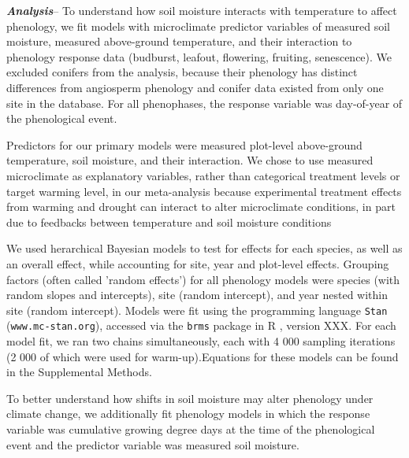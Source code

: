 \documentclass{article}
\begin{document}
\textbf {\emph{Analysis}}--
To understand how soil moisture interacts with temperature to affect phenology, we fit models with microclimate predictor variables of measured soil moisture, measured above-ground temperature, and their interaction to phenology response data (budburst, leafout, flowering, fruiting, senescence). We excluded conifers from the analysis, because their phenology has distinct differences from angiosperm phenology \cite{polgar2014} and conifer data existed from only one site in the database. For all phenophases, the response variable was day-of-year of the phenological event. 
\par Predictors for our primary models were measured plot-level above-ground temperature, soil moisture, and their interaction. We chose to use measured microclimate as explanatory variables, rather than categorical treatment levels or target warming level, in our meta-analysis because experimental treatment effects from warming and drought can interact to alter microclimate conditions, in part due to feedbacks between temperature and soil moisture conditions \citep{ettinger2019,mcdaniel2014}

\par We used herarchical Bayesian models to test for effects for each species, as well as an overall effect, while accounting for site, year and plot-level effects. Grouping factors (often called 'random effects') for all phenology models were species (with random slopes and intercepts), site (random intercept), and year nested within site (random intercept). Models were fit using the programming language \texttt{Stan} \citep{Carpenter:2016aa} (\texttt{www.mc-stan.org}), accessed via the \texttt{brms}\citep{brms2021} package in R \citep{Rcore2022}, version XXX.  For each model fit, we ran two chains simultaneously, each with 4 000 sampling iterations (2 000 of which were used for warm-up).Equations for these models can be found in the Supplemental Methods. 

\par To better understand how shifts in soil moisture may alter phenology under climate change, we additionally fit phenology models in which the response variable was cumulative growing degree days at the time of the phenological event and the predictor variable was measured soil moisture.  
\end{document}
